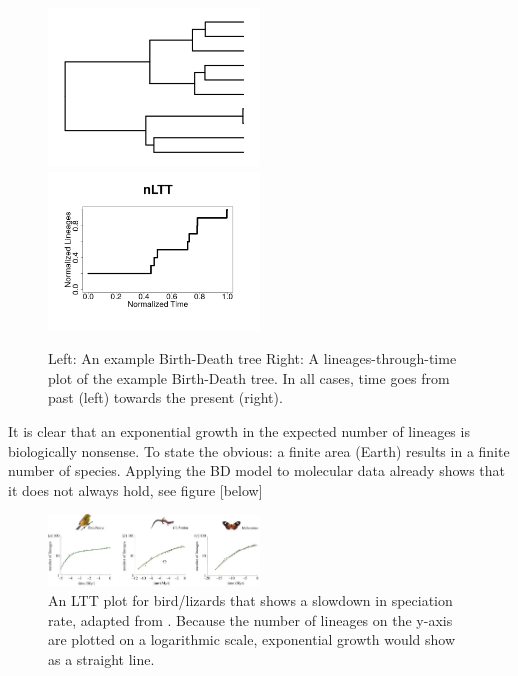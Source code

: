 \begin{figure}[H]
  \includegraphics[width=0.5\textwidth]{bd_tree.png}
  \includegraphics[width=0.5\textwidth]{bd_tree_nltt.png}
  \caption{
    Left: An example Birth-Death tree
    Right: A lineages-through-time plot of the example Birth-Death tree.
    In all cases, time goes from past (left) towards the present (right).
  }
  \label{fig:bd}
\end{figure}

It is clear that an exponential growth in the expected number of lineages
is biologically nonsense. 
To state the obvious: a finite area (Earth) results in a finite number of species. 
Applying the BD model to molecular data already shows that it does not
always hold, see figure [below]

\begin{figure}[H]
  \includegraphics[width=0.5\textwidth]{etienne_et_al_2012_dd.png}
  \caption{
    An LTT plot for bird/lizards that shows a slowdown in speciation
    rate, adapted from \cite{etienne2012diversity}. Because the number
    of lineages on the y-axis are plotted on a logarithmic scale,
    exponential growth would show as a straight line. 
  }
  \label{fig:bd}
\end{figure}

